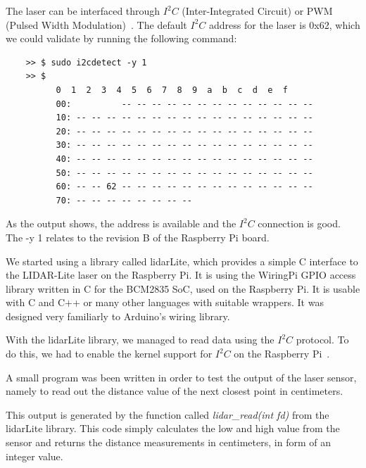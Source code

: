 The laser can be interfaced through $I^2C$ (Inter-Integrated Circuit) or PWM (Pulsed Width Modulation)~\cite{lidarsum}. The default $I^2C$ address for the laser is 0x62, which we could validate by running the following command:
\lstset{language=sh}
\begin{lstlisting}
	>> $ sudo i2cdetect -y 1
	>> $
		  0  1  2  3  4  5  6  7  8  9  a  b  c  d  e  f
		  00:          -- -- -- -- -- -- -- -- -- -- -- -- --
		  10: -- -- -- -- -- -- -- -- -- -- -- -- -- -- -- --
		  20: -- -- -- -- -- -- -- -- -- -- -- -- -- -- -- --
		  30: -- -- -- -- -- -- -- -- -- -- -- -- -- -- -- --
		  40: -- -- -- -- -- -- -- -- -- -- -- -- -- -- -- --
		  50: -- -- -- -- -- -- -- -- -- -- -- -- -- -- -- --
		  60: -- -- 62 -- -- -- -- -- -- -- -- -- -- -- -- --
		  70: -- -- -- -- -- -- -- -- 
\end{lstlisting}

As the output shows, the address is available and the $I^2C$ connection is good. The -y 1 relates to the revision B of the Raspberry Pi board.

We started using a library called lidarLite, which provides a simple C interface to the LIDAR-Lite laser on the Raspberry Pi. It is using the WiringPi GPIO access library written in C for the BCM2835 SoC, used on the Raspberry Pi. It is usable with C and C++ or many other languages with suitable wrappers. It was designed very familiarly to Arduino's wiring library.

With the lidarLite library\cite{lidarlib}, we managed to read data using the $I^2C$ protocol. To do this, we had to enable the kernel support for $I^2C$ on the Raspberry Pi~\cite{i2csetup}.

A small program was been written in order to test the output of the laser sensor, namely to read out the distance value of the next closest point in centimeters. 



This output is generated by the function called \textit{lidar\_read(int fd)} from the lidarLite library. This code simply calculates the low and high value from the sensor and returns the distance measurements in centimeters, in form of an integer value.



